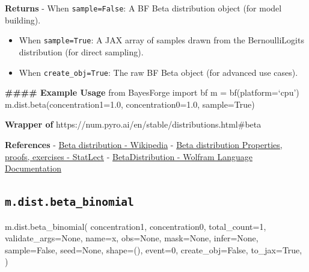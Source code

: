\documentclass[
  letterpaper,
  DIV=11,
  numbers=noendperiod]{scrartcl}
\newenvironment{Shaded}{\begin{snugshade}}{\end{snugshade}}
\newcommand{\DecValTok}[1]{\textcolor[rgb]{0.68,0.00,0.00}{#1}}
\newcommand{\NormalTok}[1]{\textcolor[rgb]{0.00,0.23,0.31}{#1}}
\newcommand{\OperatorTok}[1]{\textcolor[rgb]{0.37,0.37,0.37}{#1}}
\newcommand{\StringTok}[1]{\textcolor[rgb]{0.13,0.47,0.30}{#1}}
\newcommand{\VariableTok}[1]{\textcolor[rgb]{0.07,0.07,0.07}{#1}}
\begin{document}
\textbf{Returns} - When \texttt{sample=False}: A BF Beta distribution
object (for model building).

\begin{itemize}
\item
  When \texttt{sample=True}: A JAX array of samples drawn from the
  BernoulliLogits distribution (for direct sampling).
\item
  When \texttt{create\_obj=True}: The raw BF Beta object (for advanced
  use cases).
\end{itemize}

\textbf{\#\#\#\# Example Usage} from BayesForge import bf m =
bf(platform=`cpu') m.dist.beta(concentration1=1.0, concentration0=1.0,
sample=True)

\textbf{Wrapper of}
https://num.pyro.ai/en/stable/distributions.html\#beta

\textbf{References} -
\href{https://en.wikipedia.org/wiki/Beta_distribution}{Beta distribution
- Wikipedia} -
\href{https://www.statlect.com/probability-distributions/beta-distribution}{Beta
distribution \textbar{} Properties, proofs, exercises - StatLect} -
\href{https://reference.wolfram.com/language/ref/BetaDistribution.html}{BetaDistribution
- Wolfram Language Documentation}

\subsection{\texorpdfstring{\texttt{m.dist.beta\_binomial}}{m.dist.beta\_binomial}}\label{beta_binomial}

\begin{Shaded}
\begin{Highlighting}[]
\NormalTok{m.dist.beta\_binomial(}
\NormalTok{    concentration1,}
\NormalTok{    concentration0,}
\NormalTok{    total\_count}\OperatorTok{=}\DecValTok{1}\NormalTok{,}
\NormalTok{    validate\_args}\OperatorTok{=}\VariableTok{None}\NormalTok{,}
\NormalTok{    name}\OperatorTok{=}\StringTok{\textquotesingle{}x\textquotesingle{}}\NormalTok{,}
\NormalTok{    obs}\OperatorTok{=}\VariableTok{None}\NormalTok{,}
\NormalTok{    mask}\OperatorTok{=}\VariableTok{None}\NormalTok{,}
\NormalTok{    infer}\OperatorTok{=}\VariableTok{None}\NormalTok{,}
\NormalTok{    sample}\OperatorTok{=}\VariableTok{False}\NormalTok{,}
\NormalTok{    seed}\OperatorTok{=}\VariableTok{None}\NormalTok{,}
\NormalTok{    shape}\OperatorTok{=}\NormalTok{(),}
\NormalTok{    event}\OperatorTok{=}\DecValTok{0}\NormalTok{,}
\NormalTok{    create\_obj}\OperatorTok{=}\VariableTok{False}\NormalTok{,}
\NormalTok{    to\_jax}\OperatorTok{=}\VariableTok{True}\NormalTok{,}
\NormalTok{)}
\end{Highlighting}
\end{Shaded}
\end{document}
